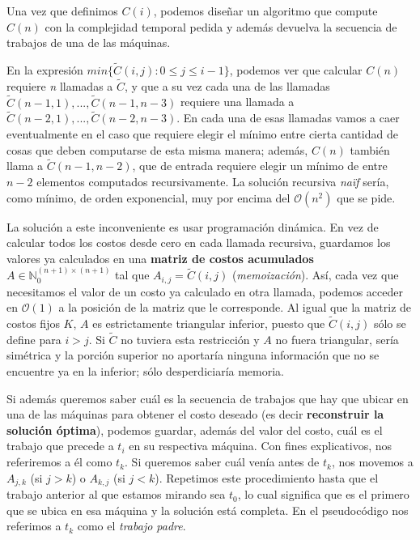 \documentclass[a4paper]{report}
\begin{document}
Una vez que definimos $C(i)$, podemos diseñar un algoritmo que compute $C(n)$ con la complejidad temporal pedida y además devuelva la secuencia de trabajos de una de las máquinas.

En la expresión $min\{ \tilde{C}(i, j) : 0 \leq j \leq i-1 \}$, podemos ver que calcular $C(n)$ requiere \textit{n} llamadas a $\tilde{C}$, y que a su vez cada una de las llamadas $\tilde{C}(n-1,1),...,\tilde{C}(n-1,n-3)$ requiere una llamada a $\tilde{C}(n-2, 1),...,\tilde{C}(n-2,n-3)$. En cada una de esas llamadas vamos a caer eventualmente en el caso que requiere elegir el mínimo entre cierta cantidad de cosas que deben computarse de esta misma manera; además, $C(n)$ también llama a $\tilde{C}(n-1,n-2)$, que de entrada requiere elegir un mínimo de entre $n-2$ elementos computados recursivamente. La solución recursiva \textit{naïf} sería, como mínimo, de orden exponencial, muy por encima del $\mathcal{O}(n^{2})$ que se pide.

La solución a este inconveniente es usar programación dinámica. En vez de calcular todos los costos desde cero en cada llamada recursiva, guardamos los valores ya calculados en una \textbf{matriz de costos acumulados} $A \in \mathbb{N}_{0}^{(n+1) \times (n+1)}$ tal que $A_{i,j} = \tilde{C}(i,j)$ (\textit{memoización}). Así, cada vez que necesitamos el valor de un costo ya calculado en otra llamada, podemos acceder en $\mathcal{O}(1)$ a la posición de la matriz que le corresponde. Al igual que la matriz de costos fijos $K$, $A$ es estrictamente triangular inferior, puesto que $\tilde{C}(i,j)$ sólo se define para $i > j$. Si $\tilde{C}$ no tuviera esta restricción y $A$ no fuera triangular, sería simétrica y la porción superior no aportaría ninguna información que no se encuentre ya en la inferior; sólo desperdiciaría memoria.

Si además queremos saber cuál es la secuencia de trabajos que hay que ubicar en una de las máquinas para obtener el costo deseado (es decir \textbf{reconstruir la solución óptima}), podemos guardar, además del valor del costo, cuál es el trabajo que precede a $t_{i}$ en su respectiva máquina. Con fines explicativos, nos referiremos a él como $t_{k}$. Si queremos saber cuál venía antes de $t_{k}$, nos movemos a $A_{j,k}$ (si $j>k$) o $A_{k,j}$ (si $j<k$). Repetimos este procedimiento hasta que el trabajo anterior al que estamos mirando sea $t_{0}$, lo cual significa que es el primero que se ubica en esa máquina y la solución está completa. En el pseudocódigo nos referimos a $t_{k}$ como el \textit{trabajo padre}.
\end{document}

